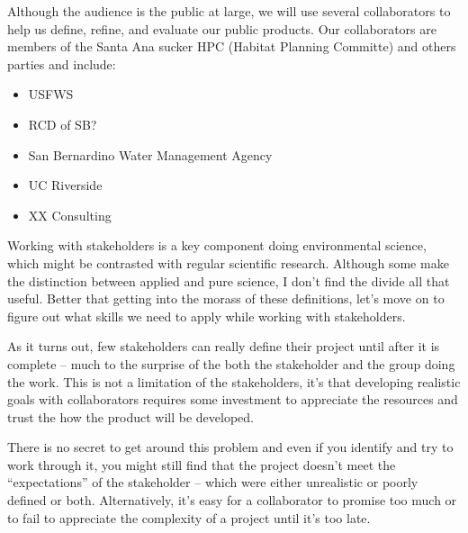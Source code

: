\documentclass{tufte-handout}\usepackage[]{graphicx}\usepackage[]{color}
\begin{document}
Although the audience is the public at large, we will use several collaborators to help us define, refine, and evaluate our public products.  
Our collaborators are members of the Santa Ana sucker HPC (Habitat Planning Committe) and others parties and include: 

\begin{itemize}
  \item USFWS
  \item RCD of SB?
  \item San Bernardino Water Management Agency
  \item UC Riverside
  \item XX Consulting
\end{itemize}








Working with stakeholders is a key component doing environmental science, which might be contrasted with regular scientific research. Although some make the distinction between applied and pure science, I don't find the divide all that useful. Better that getting into the morass of these definitions, let's move on to figure out what skills we need to apply while working with stakeholders. 

As it turns out, few stakeholders can really define their project until after it is complete -- much to the surprise of the both the stakeholder and the group doing the work. This is not a limitation of the stakeholders, it's that developing realistic goals with collaborators requires some investment to appreciate the resources and trust the how the product will be developed. 

There is no secret to get around this problem and even if you identify and try to work through it, you might still find that the project doesn't meet the ``expectations'' of the stakeholder -- which were either unrealistic or poorly defined or both. Alternatively, it's easy for a collaborator to promise too much or to fail to appreciate the complexity of a project until it's too late. 
\end{document}
